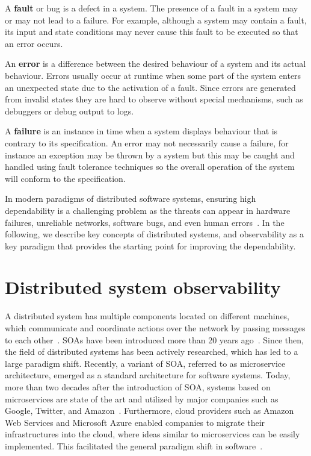 A \textbf{fault} or bug is a defect in a system. The presence of a fault in a system may or may not lead to a failure. For example, although a system may contain a fault, its input and state conditions may never cause this fault to be executed so that an error occurs. 

An \textbf{error} is a difference between the desired behaviour of a system and its actual behaviour. Errors usually occur at runtime when some part of the system enters an unexpected state due to the activation of a fault. Since errors are generated from invalid states they are hard to observe without special mechanisms, such as debuggers or debug output to logs.

A \textbf{failure} is an instance in time when a system displays behaviour that is contrary to its specification. An error may not necessarily cause a failure, for instance an exception may be thrown by a system but this may be caught and handled using fault tolerance techniques so the overall operation of the system will conform to the specification.

In modern paradigms of distributed software systems, ensuring high dependability is a challenging problem as the threats can appear in hardware failures, unreliable networks, software bugs, and even human errors~\cite{imweber2015}. In the following, we describe key concepts of distributed systems, and observability as a key paradigm that provides the starting point for improving the dependability.

\section{Distributed system observability}
\label{ch:background:sec:observability}
A distributed system has multiple components located on different machines, which communicate and coordinate actions over the network by passing messages to each other~\cite{tanenbaum2007distributed}.
SOAs have been introduced more than 20 years ago~\cite{abrams2008service}. Since then, the field of distributed systems has been actively researched, which has led to a large paradigm shift. Recently, a variant of SOA, referred to as microservice architecture, emerged as a standard architecture for software systems. Today, more than two decades after the introduction of SOA, systems based on microservices are state of the art and utilized by major companies such as Google, Twitter, and Amazon~\cite{observability2020practical}. Furthermore, cloud providers such as Amazon Web Services and Microsoft Azure enabled companies to migrate their infrastructures into the cloud, where ideas similar to microservices can be easily implemented. This facilitated the general paradigm shift in software~\cite{jungnickel2018feasibility}. 

